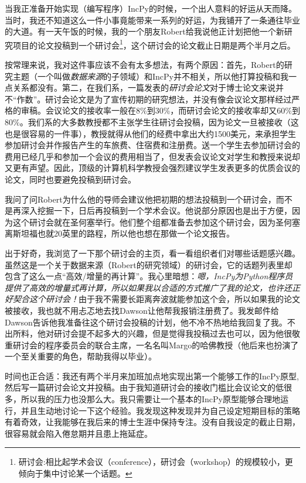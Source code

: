 \documentclass[letter,12pt]{book}
\begin{document}
\begin{CJK}{UTF8}{gbsn}
当我正准备开始实现（编写程序）IncPy的时候，一个出人意料的好运从天而降。当时，我还不知道这么一件小事竟能带来一系列的好运，为我铺开了一条通往毕业的大道。有一天午饭的时候，我的一个朋友Robert给我说他正计划把他一个新研究项目的论文投稿到一个研讨会\footnote{研讨会:相比起学术会议（conference），研讨会（workshop）的规模较小，更倾向于集中讨论某一个话题。}，这个研讨会的论文截止日期是两个半月之后。

按常理来说，我对这件事应该不会有太多想法，有两个原因：首先，Robert的研究主题（一个叫做\emph{数据来源}的子领域）和IncPy并不相关，所以他打算投稿和我一点关系都没有。第二，在我们系，一篇发表的\emph{研讨会论文}对于博士论文来说并不“作数”。研讨会论文是为了宣传初期的研究想法，并没有像会议论文那样经过严格的审稿。会议论文的接收率一般在8\%到30\%，而研讨会论文的接收率却又60\%到80\%。我们系的大多数教授都不主张学生往研讨会投稿，因为论文一旦被接收（这也是很容易的一件事），教授就得从他们的经费中拿出大约1500美元，来承担学生参加研讨会并作报告产生的车旅费、住宿费和注册费。送一个学生去参加研讨会的费用已经几乎和参加一个会议的费用相当了，但发表会议论文对学生和教授来说却又更有声望。因此，顶级的计算机科学教授会强烈建议学生发表更多的优质会议的论文，同时也要避免投稿到研讨会。

我问了问Robert为什么他的导师会建议他把初期的想法投稿到一个研讨会，而不是再深入挖掘一下，日后再投稿到一个学术会议。他说部分原因也是出于方便，因为这个研讨会就在圣何塞举行。他们整个组都准备去参加这个研讨会，因为圣何塞离斯坦福也就20英里的路程，所以他也想在那做一个论文报告。

出于好奇，我浏览了一下那个研讨会的主页，看一看组织者们对哪些话题感兴趣。虽然这是一个关于数据来源（Robert的研究领域）的研讨会，它的话题列表里却包含了这么一点“高效/增量的再计算”。我心里暗想：\emph{嗯，IncPy为Python程序员提供了高效的增量式再计算，所以如果我以合适的方式推广了我的论文，也许还正好契合这个研讨会！}由于我不需要长距离奔波就能参加这个会，所以如果我的论文被接收，我也就不用忐忑地去找Dawson让他帮我报销注册费了。我发邮件给Dawson告诉他我准备往这个研讨会投稿的计划，他不冷不热地给我回复了我。不出所料，他对研讨会提不起多大的兴趣，但是觉得我投稿过去也可以，因为他很敬重研讨会的程序委员会的联合主席，一名名叫Margo的哈佛教授（他后来也扮演了一个至关重要的角色，帮助我得以毕业）。

时间也正合适：我还有两个半月来加班加点地实现出第一个能够工作的IncPy原型,然后写一篇研讨会论文并投稿。由于我知道研讨会的接收门槛比会议论文的低很多，所以我的压力也没那么大。我只需要让一个基本的IncPy原型能够合理地运行，并且生动地讨论一下这个经验。我发现这种发现并为自己设定短期目标的策略有着奇效，让我能够在我后来的博士生涯中保持专注。没有自我设定的截止日期，很容易就会陷入倦怠期并且患上拖延症。


\end{CJK}
\end{document}
